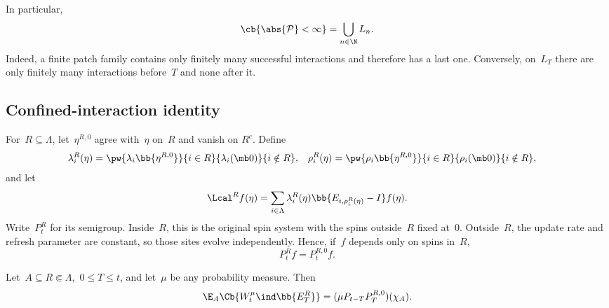 In particular,
\begin{equation}
\label{eq:finite-patch-family-last-interaction}
\cb{\abs{\mathcal P}<\infty}
=
\bigcup_{n\in\N}L_n.
\end{equation}
Indeed, a finite patch family contains only finitely many successful
interactions and therefore has a last one. Conversely, on~$L_T$ there are only
finitely many interactions before~$T$ and none after it.

\subsection{Confined-interaction identity}
\label{app:confined-interactions}

For~$R\subseteq\Lambda$, let~$\eta^{R,0}$ agree with~$\eta$ on~$R$ and vanish on
$R^c$. Define
\begin{align*}
\lambda_i^R(\eta)
&=
\pw{\lambda_i\bb{\eta^{R,0}}}{i\in R}
{\lambda_i(\mb 0)}{i\notin R},
&
\rho_i^R(\eta)
&=
\pw{\rho_i\bb{\eta^{R,0}}}{i\in R}
{\rho_i(\mb 0)}{i\notin R},
\end{align*}
and let
\begin{equation*}
\Lcal^R f(\eta)
=
\sum_{i\in\Lambda}
\lambda_i^R(\eta)
\bb{E_{i,\rho_i^R(\eta)}-I}f(\eta).
\end{equation*}
Write~$P_t^R$ for its semigroup. Inside~$R$, this is the original spin system
with the spins outside~$R$ fixed at~$0$. Outside~$R$, the update rate and refresh
parameter are constant, so those sites evolve independently. Hence, if~$f$
depends only on spins in~$R$,
\begin{equation}
\label{eq:modified-zero-boundary-agreement}
P_t^Rf=P_t^{R,0}f.
\end{equation}

\begin{proposition}
\label{prop:confined-interaction-identity}
Let~$A\subseteq R\Subset\Lambda$,~$0\leq T\leq t$, and let~$\mu$ be any
probability measure. Then
\begin{equation}
\label{eq:confined-interaction-identity}
\E_A\Cb{W_t^\mu\ind\bb{E_T^R}}
=
(\mu P_{t-T}P_T^{R,0})(\chi_A).
\end{equation}
\end{proposition}

